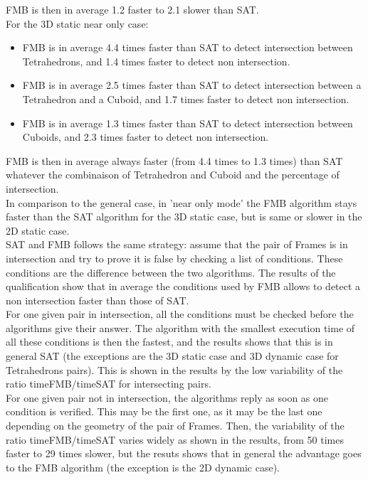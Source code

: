 \documentclass[12pt, a4paper]{article}
\begin{document}
FMB is then in average 1.2 faster to 2.1 slower than SAT.\\ 

For the 3D static near only case:\\

\begin{itemize}
\item FMB is in average 4.4 times faster than SAT to detect intersection between Tetrahedrons, and 1.4 times faster to detect non intersection.\\
\item FMB is in average 2.5 times faster than SAT to detect intersection between a Tetrahedron and a Cuboid, and 1.7 times faster to detect non intersection.\\
\item FMB is in average 1.3 times faster than SAT to detect intersection between Cuboids, and 2.3 times faster to detect non intersection.\\
\end{itemize}

FMB is then in average always faster (from 4.4 times to 1.3 times) than SAT whatever the combinaison of Tetrahedron and Cuboid and the percentage of intersection.\\

In comparison to the general case, in 'near only mode' the FMB algorithm stays faster than the SAT algorithm for the 3D static case, but is same or slower in the 2D static case.\\

SAT and FMB follows the same strategy: assume that the pair of Frames is in intersection and try to prove it is false by checking a list of conditions. These conditions are the difference between the two algorithms. The results of the qualification show that in average the conditions used by FMB allows to detect a non intersection faster than those of SAT.\\

For one given pair in intersection, all the conditions must be checked before the algorithms give their answer. The algorithm with the smallest execution time of all these conditions is then the fastest, and the results shows that this is in general SAT (the exceptions are the 3D static case and 3D dynamic case for Tetrahedrons pairs). This is shown in the results by the low variability of the ratio timeFMB/timeSAT for intersecting pairs.\\

For one given pair not in intersection, the algorithms reply as soon as one condition is verified. This may be the first one, as it may be the last one depending on the geometry of the pair of Frames. Then, the variability of the ratio timeFMB/timeSAT varies widely as shown in the results, from 50 times faster to 29 times slower, but the resuts shows that in general the advantage goes to the FMB algorithm (the exception is the 2D dynamic case).\\
\end{document}

